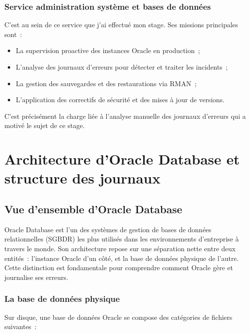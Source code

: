 \documentclass[12pt,a4paper]{report}
\begin{document}
\subsection{Service administration syst\`eme et bases de donn\'ees}

C'est au sein de ce service que j'ai effectu\'e mon stage. Ses missions principales sont~:

\begin{itemize}[leftmargin=*]
  \item La supervision proactive des instances Oracle en production~;
  \item L'analyse des journaux d'erreurs pour d\'etecter et traiter les incidents~;
  \item La gestion des sauvegardes et des restaurations via RMAN~;
  \item L'application des correctifs de s\'ecurit\'e et des mises \`a jour de versions.
\end{itemize}

C'est pr\'ecis\'ement la charge li\'ee \`a l'analyse manuelle des journaux d'erreurs qui
a motiv\'e le sujet de ce stage.

\chapter{Architecture d'Oracle Database et structure des journaux}

\section{Vue d'ensemble d'Oracle Database}

Oracle Database est l'un des syst\`emes de gestion de bases de donn\'ees relationnelles
(SGBDR) les plus utilis\'es dans les environnements d'entreprise \`a travers le monde.
Son architecture repose sur une s\'eparation nette entre deux entit\'es~: l'instance
Oracle d'un c\^ot\'e, et la base de donn\'ees physique de l'autre. Cette distinction
est fondamentale pour comprendre comment Oracle g\`ere et journalise ses erreurs.

\subsection{La base de donn\'ees physique}

Sur disque, une base de donn\'ees Oracle se compose des cat\'egories de fichiers suivantes~:
\end{document}
